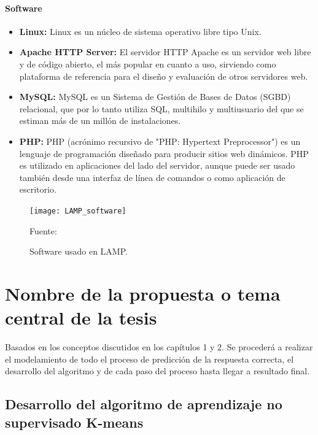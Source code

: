 \subsubsection{Software}

\begin{itemize}
	\item \textbf{Linux:} Linux es un núcleo de sistema operativo libre tipo Unix.
	\item \textbf{Apache HTTP Server:} El servidor HTTP Apache es un servidor web libre y de código abierto, el más popular en cuanto a uso, sirviendo como plataforma de referencia para el diseño y evaluación de otros servidores web.
	\item \textbf{MySQL:} MySQL es un Sistema de Gestión de Bases de Datos (SGBD) relacional, que por 	lo tanto utiliza SQL, multihilo y multiusuario del que se estiman más de un millón de instalaciones.
	\item \textbf{PHP:} PHP (acrónimo recursivo de "PHP: Hypertext Preprocessor") es un lenguaje de programación diseñado para producir sitios web dinámicos. PHP es utilizado en aplicaciones del lado del servidor, aunque puede ser usado también desde una interfaz de línea de comandos o como aplicación de escritorio.
\end{itemize}

\begin{figure}[ht]
	\begin{center}
		\texttt{[image: LAMP\_software]}
	\end{center}
	\begin{center}
		\vskip -0.5cm
		\caption{\small{Software usado en LAMP.}}
		{\small{Fuente: }}
	\end{center}
\end{figure}



\chapter{Nombre de la propuesta o tema central de la tesis}

Basados en los conceptos discutidos en los capítulos 1 y 2. Se procederá a realizar el modelamiento de todo el proceso de predicción de la respuesta correcta, el desarrollo del algoritmo y de cada paso del proceso hasta llegar a resultado final.

\section{Desarrollo del algoritmo de aprendizaje no supervisado K-means} 

